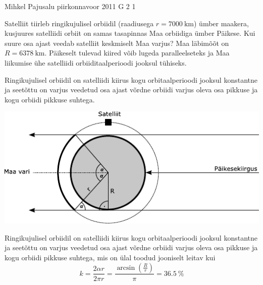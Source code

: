 {Mihkel Pajusalu} %
{piirkonnavoor} %
{2011} %
{G 2} %
{1} %
{
\ifStatement
Satelliit tiirleb ringikujulisel orbiidil (raadiusega $r=\SI{7000}{\kilo\metre}$) ümber maakera, kusjuures satelliidi orbiit on samas tasapinnas Maa orbiidiga ümber Päikese. Kui suure osa ajast veedab satelliit keskmiselt Maa varjus? Maa läbimõõt on $R=\SI{6378}{\kilo\metre}$. Päikeselt tulevad kiired võib lugeda paralleelseteks ja Maa liikumise ühe satelliidi orbiiditaalperioodi jooksul tühiseks.
\fi


\ifHint
Ringikujulisel orbiidil on satelliidi kiirus kogu orbitaalperioodi jooksul konstantne ja seetõttu on varjus veedetud osa ajast võrdne orbiidi varjus oleva osa pikkuse ja kogu orbiidi pikkuse suhtega.
\fi


\ifSolution
\begin{center}
	\includegraphics[width=0.9\linewidth]{2011-v2g-02-lah}
\end{center}
Ringikujulisel orbiidil on satelliidi kiirus kogu orbitaalperioodi jooksul konstantne ja seetõttu on varjus veedetud osa ajast võrdne orbiidi varjus oleva osa pikkuse ja kogu orbiidi pikkuse suhtega, mis on ülal toodud jooniselt leitav kui 
\[
k=\frac{2 \alpha r}{2 \pi r}=\frac{\arcsin \left(\frac{R}{r}\right)}{\pi}=\SI{36,5}{\%}
\]
\fi
}